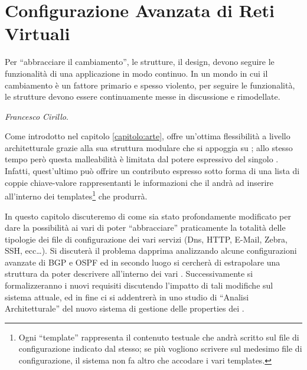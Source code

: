 \chapter{Configurazione Avanzata di Reti Virtuali}\label{capitolo:evoluzione_visualnetkit}

\begin{flushright}
\begin{footnotesize}
Per ``abbracciare il cambiamento'', le strutture, il design, devono seguire le funzionalità di una applicazione in modo continuo. In un mondo in cui il cambiamento è un fattore primario e spesso violento, per seguire le funzionalità, le strutture devono essere continuamente messe in discussione e rimodellate.\\
\end{footnotesize}
\begin{footnotesize}
\textit{Francesco Cirillo}.
\end{footnotesize}
\end{flushright}

Come introdotto nel capitolo \ref{capitolo:arte}, \visualnetkit{} offre un'ottima flessibilità a livello architetturale grazie alla sua struttura modulare che si appoggia su \plugin{}; allo stesso tempo però questa malleabilità è limitata dal potere espressivo del singolo \plugin{}. Infatti, quest'ultimo può offrire un contributo espresso sotto forma di una lista di coppie chiave-valore rappresentanti le informazioni che il \plugin{} andrà ad inserire all'interno dei templates\footnote{Ogni ``template'' rappresenta il contenuto testuale che andrà scritto sul file di configurazione indicato dal \plugin{} stesso; se più \plugin{} vogliono scrivere sul medesimo file di configurazione, il sistema non fa altro che accodare i vari templates.} che produrrà.

In questo capitolo discuteremo di come \visualnetkit{} sia stato profondamente modificato per dare la possibilità ai vari \plugin{} di poter ``abbracciare'' praticamente la totalità delle tipologie dei file di configurazione dei vari servizi (Dns, HTTP, E-Mail, Zebra, SSH, ecc\ldots). Si discuterà il problema dapprima analizzando alcune configurazioni avanzate di BGP e OSPF ed in secondo luogo si cercherà di estrapolare una struttura da poter descrivere all'interno dei vari \plugin{}. Successivamente si formalizzeranno i nuovi requisiti discutendo l'impatto di tali modifiche sul sistema attuale, ed in fine ci si addentrerà in uno studio di ``Analisi Architetturale'' del nuovo sistema di gestione delle properties dei \plugin{}.

